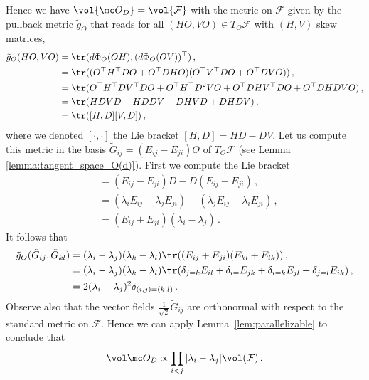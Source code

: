\documentclass[twoside,a4paper,11pt]{article}
\renewcommand{\phi}{\varphi}
\theoremstyle{plain}
\begin{document}
Hence we have $\vol{\mc O_D} = \vol{\mathcal{F}}$ with the metric on $\mathcal{F}$ given by the pullback metric $\tilde{g}_{O}$ that reads for all $(HO, VO) \in T_O\mathcal{F}$ with $(H,V)$ skew matrices,
\begin{align*}
    \tilde{g}_{O}(HO, VO) & = \tr(d \Phi_O(OH), (d \Phi_O(OV))^\top) \, , \\
    & = \tr((O^\top H^\top DO + O^\top DH O)(O^\top V^\top D O +O^\top DVO)) \, ,\\
    &= \tr(O^\top H^\top DV^\top D O + O^\top H^\top D^2 VO + O^\top DH V^\top D O + O^\top DH DV O) \, , \\
    &= \tr(HDVD - HD DV - DH VD + DH DV) \, , \\
    & = \tr([H, D][V, D]) \, ,
\end{align*}
where we denoted $[\cdot, \cdot]$ the Lie bracket $[H, D] = HD - DV$.
Let us compute this metric in the basis $\tilde{G}_{ij} = (E_{ij} - E_{ji})O$ of $T_O\mathcal{F}$ (see Lemma \ref{lemma:tangent_space_O(d)}). First we compute the Lie bracket
\begin{align*}
    [E_{ij} - E_{ji}, D] & = (E_{ij} - E_{ji})D - D(E_{ij} - E_{ji}) \, , \\
    & = (\lambda_i E_{ij} - \lambda_j E_{ji}) - (\lambda_j E_{ij} - \lambda_i E_{ji}) \, , \\
    & = (E_{ij} + E_{ji})(\lambda_i - \lambda_j) \, .
\end{align*}
It follows that 
\begin{align*}
    \tilde{g}_{O}(\tilde{G}_{ij}, \tilde{G}_{kl}) & = (\lambda_i - \lambda_j)(\lambda_k - \lambda_l)\tr((E_{ij} + E_{ji})(E_{kl} + E_{lk})) \, ,\\ 
    & = (\lambda_i - \lambda_j)(\lambda_k - \lambda_l)\tr(\delta_{j=k}E_{il} + \delta_{i=} E_{jk} + \delta_{i=k}E_{jl} + \delta_{j=l}E_{ik}) \, , \\
    & = 2(\lambda_i - \lambda_j)^2\delta_{(i,j)=(k,l)} \, .
\end{align*}
Observe also that the vector fields $\frac{1}{\sqrt{2}}\tilde G_{ij}$
are orthonormal with respect to
the standard metric on $\mathcal{F}$.
Hence we can apply Lemma~\ref{lem:parallelizable}
to conclude that
$$
\vol \mc O_D \propto \prod_{i<j} |\lambda_i - \lambda_j| \vol(\mathcal{F}) \, .
$$
\end{document}
